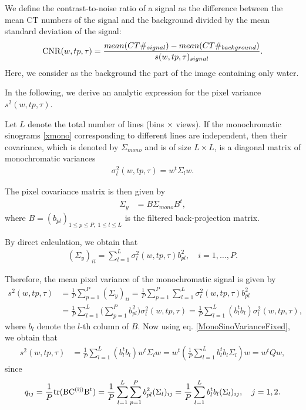 \documentclass[12pt,twoside]{article}   %
\def\S{\Sigma}
\begin{document}
 We define the contrast-to-noise ratio of a signal as the difference between the mean CT numbers of the signal and the background divided by the mean standard deviation of the signal:
\begin{align}\label{CNR}
    {\rm{CNR}}(w,tp,\tau) = \frac{mean(CT\#_{signal}) - mean(CT\#_{background})}{s(w,tp,\tau)_{signal}}.
\end{align}
Here, we consider as the background the part of the image containing only water.

In the following, we derive an analytic expression for the pixel variance $s^2(w,tp,\tau)$. 

Let $L$ denote the total number of lines (bins $\times$ views). If the monochromatic sinograms \eqref{xmono} corresponding to different lines are independent, then their covariance, which is denoted by $\Sigma_{mono}$ and is of size $L \times L$, is a diagonal matrix of monochromatic variances
\begin{align}\label{MonoSinoVarianceFixed}
\sigma^2_l(w,tp,\tau) = w^t \S_lw.
\end{align}

The pixel covariance matrix is then given by
\begin{align}
 \S_y &= B \Sigma_{mono} B^t,
\end{align}
where $B = (b_{pl})_{1\leq p\leq P,\; 1\leq l\leq L}$ is the filtered back-projection matrix. 

By direct calculation, we obtain that
\begin{align}\label{VMIvariance}
 (\S_y)_{ii} =\sum_{l=1}^L \sigma^2_l(w,tp,\tau)b_{pl}^2, \quad i=1,\dots, P.
\end{align}

Therefore, the mean pixel variance of the monochromatic signal is given by
\begin{align}\label{VMIvar_ave}
s^2(w,tp,\tau) &= \frac{1}{P}\sum_{p=1}^P (\S_y)_{ii} 
 = \frac{1}{P} \sum_{p=1}^P \sum_{l=1}^L \sigma^2_l(w,tp,\tau)b_{pl}^2 \nonumber \\
 &= \frac{1}{P}\sum_{l=1}^L \big({\textstyle \sum}_{p=1}^P b_{pl}^2\big) \sigma^2_l(w,tp,\tau) 
 = \frac{1}{P}\sum_{l=1}^L(b_l^tb_l)\sigma^2_l(w,tp,\tau),
\end{align}
where $b_l$ denote the $l$-th column of $B$. Now using eq. \eqref{MonoSinoVarianceFixed}, we obtain that
\begin{align}\label{VMIvar_ave2}
s^2(w,tp,\tau) 
& = \frac{1}{P} \sum_{l=1}^L(b_l^tb_l) w^t \S_l w 
=  w^t \left(\frac{1}{P}\sum_{l=1}^Lb_l^tb_l \S_l \right) w =  w^t Q w, 
\end{align}
since
\begin{align}
    q_{ij} = \frac{1}{P} {\rm{tr}(BC^{(ij)}B^t)} = \frac{1}{P} \sum_{l=1}^L  \sum_{p=1}^P b_{pl}^2 (\S_l)_{ij} = \frac{1}{P} \sum_{l=1}^Lb_l^tb_l (\S_l)_{ij}  , \quad j=1,2.
\end{align}
\end{document}
